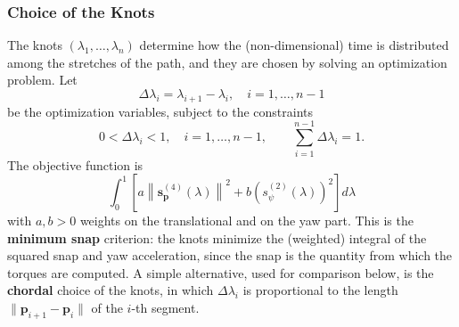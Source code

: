 \documentclass[10pt, a4paper]{report}
\begin{document}
\subsubsection{Choice of the Knots}
The knots $(\lambda_1,\dots,\lambda_n)$ determine how the (non-dimensional) time is distributed among the stretches of the path, and they are chosen by solving an optimization problem. Let\begin{equation}
    \Delta\lambda_i=\lambda_{i+1}-\lambda_i,\quad i=1,\dots,n-1
\end{equation}
be the optimization variables, subject to the constraints\begin{equation}
    0<\Delta\lambda_i<1,\quad i=1,\dots,n-1,\quad\quad\sum_{i=1}^{n-1}\Delta\lambda_i=1.
\end{equation}
The objective function is\begin{equation}
    \int_0^1\left[a\left\|\mathbf s_{\mathbf p}^{(4)}(\lambda)\right\|^2+b\left(s_\psi^{(2)}(\lambda)\right)^2\right]d\lambda
\end{equation}
with $a,b>0$ weights on the translational and on the yaw part. This is the \textbf{minimum snap} criterion: the knots minimize the (weighted) integral of the squared snap and yaw acceleration, since the snap is the quantity from which the torques are computed. A simple alternative, used for comparison below, is the \textbf{chordal} choice of the knots, in which $\Delta\lambda_i$ is proportional to the length $\|\mathbf p_{i+1}-\mathbf p_i\|$ of the $i$-th segment.
\end{document}
